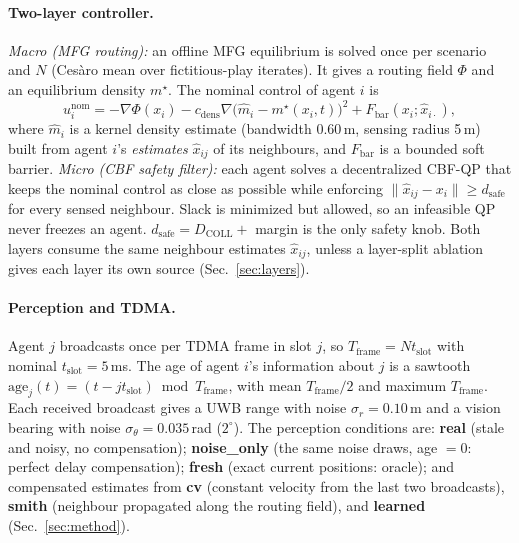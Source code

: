 \documentclass{article}
\newcommand{\Tf}{T_{\mathrm{frame}}}
\newcommand{\tslot}{t_{\mathrm{slot}}}
\newcommand{\dsafe}{d_{\mathrm{safe}}}
\begin{document}
\paragraph{Two-layer controller.}
\emph{Macro (MFG routing):} an offline MFG equilibrium is solved once per scenario and $N$ (Cesàro
mean over fictitious-play iterates). It gives a routing field $\Phi$ and an equilibrium density
$m^\star$. The nominal control of agent $i$ is
\begin{equation}
u_i^{\mathrm{nom}} = -\nabla\Phi(x_i) - c_{\mathrm{dens}}\nabla\big(\hat m_i - m^\star(x_i,t)\big)^2 + F_{\mathrm{bar}}(x_i;\hat x_{i\cdot}),
\end{equation}
where $\hat m_i$ is a kernel density estimate (bandwidth 0.60\,m, sensing radius 5\,m) built from
agent $i$'s \emph{estimates} $\hat x_{ij}$ of its neighbours, and $F_{\mathrm{bar}}$ is a bounded
soft barrier.
\emph{Micro (CBF safety filter):} each agent solves a decentralized CBF-QP that keeps the nominal
control as close as possible while enforcing $\|\hat x_{ij} - x_i\| \ge \dsafe$ for every sensed
neighbour. Slack is minimized but allowed, so an infeasible QP never freezes an agent.
$\dsafe = D_{\mathrm{COLL}} + $ margin is the only safety knob.
Both layers consume the same neighbour estimates $\hat x_{ij}$, unless a layer-split ablation
gives each layer its own source (Sec.~\ref{sec:layers}).

\paragraph{Perception and TDMA.}
Agent $j$ broadcasts once per TDMA frame in slot $j$, so $\Tf = N\tslot$ with nominal
$\tslot = 5$\,ms. The age of agent $i$'s information about $j$ is a sawtooth
$\mathrm{age}_j(t) = (t - j\tslot) \bmod \Tf$, with mean $\Tf/2$ and maximum $\Tf$.
Each received broadcast gives a UWB range with noise $\sigma_r = 0.10$\,m and a vision bearing with
noise $\sigma_\theta = 0.035$\,rad ($2^\circ$).
The perception conditions are: \textbf{real} (stale and noisy, no compensation); \textbf{noise\_only}
(the same noise draws, age $=0$: perfect delay compensation); \textbf{fresh} (exact current
positions: oracle); and compensated estimates from \textbf{cv} (constant velocity from the last two
broadcasts), \textbf{smith} (neighbour propagated along the routing field), and \textbf{learned}
(Sec.~\ref{sec:method}).
\end{document}
